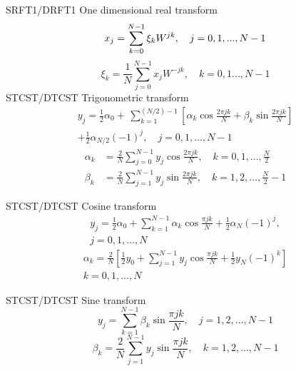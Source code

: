 \documentclass[twoside]{MATH77}
\begin{document}
SRFT1/{DRFT1} One dimensional real transform\vspace{-6pt}
\begin{equation}\label{O1}
x_j=\sum_{k=0}^{N-1}\xi _kW^{jk},\quad j=0,1,...,N-1\vspace{-6pt}
\end{equation}
\vspace{-15pt}
\begin{equation}\label{O2}
\xi _k=\frac 1N\sum_{j=0}^{N-1}x_jW^{-jk},\quad k=0,1...,N-1
\end{equation}
STCST/DTCST Trigonometric transform\vspace{-6pt}%
\begin{multline}\label{O3}
y_j=\frac 12\alpha _0+\,\sum_{k=1}^{(N/2)-1}\left[
\alpha _k\cos \frac{2\pi jk}N+\beta _k\sin \frac{2\pi jk}N\right]\\
+\frac 12\alpha _{N/2}(-1)^j,\quad j=0,1,...,N-1
\end{multline}
\vspace{-20pt}
\begin{equation}
\begin{split}\label{O4}
\alpha _k&=\frac 2N\sum_{j=0}^{N-1}y_j\cos \frac{2\pi jk}N,\quad
k=0,1,...,\frac N2\\
\beta _k&=\frac 2N\sum_{j=1}^{N-1}y_j\sin \frac{2\pi jk}N,\quad
k=1,2,...,\frac N2-1
\end{split}
\end{equation}

STCST/DTCST Cosine transform%
\begin{multline}\label{O5}
y_j=\frac 12\alpha _0+\sum_{k=1}^{N-1}\alpha _k\cos
\frac{\pi jk}N+\frac 12\alpha _N(-1)^j,\\
j=0,1,...,N
\end{multline}
\vspace{-15pt}
\begin{multline}\label{O6}
\alpha _k=\frac 2N\left[ \frac 12y_0+\sum_{j=1}^{N-1}y_j\cos
\frac{\pi jk} N+\frac 12y_N(-1)^k\right]\\
k=0,1,...,N
\end{multline}
\vspace{-15pt}

STCST/DTCST Sine transform
\begin{equation}\label{O7}
y_j=\sum_{k=1}^{N-1}\beta _k\sin \frac{\pi jk}N,\quad
j=1,2,...,N-1
\end{equation}
\vspace{-10pt}
\begin{equation}\label{O8}
\beta _k=\frac 2N\sum_{j=1}^{N-1}y_j\sin \frac{\pi jk}N,\quad
k=1,2,...,N-1
\end{equation}
\end{document}
